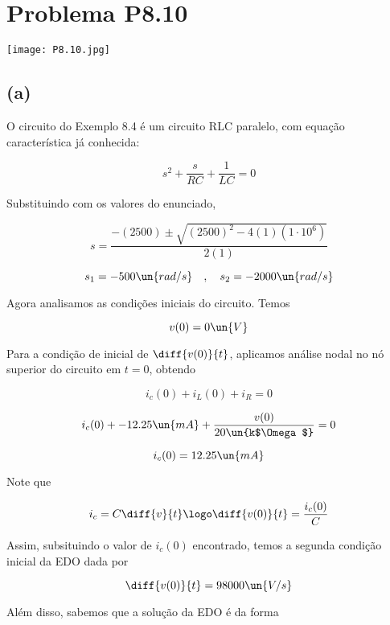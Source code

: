 
\section*{Problema P8.10}

\renewcommand*\thesection{8.10}

\begin{center}
    \texttt{[image: P8.10.jpg]}
\end{center}

\subsection*{(a)}

O circuito do Exemplo 8.4 é um circuito RLC paralelo, com equação característica já conhecida:

\begin{equation}\label{eq:8.10.1}
    s^2 + \frac{s}{RC} + \frac{1}{LC} = 0
\end{equation}

Substituindo com os valores do enunciado,

\[ s = \frac{-(2500) \pm \sqrt{(2500)^2 - 4(1)(1 \cdot 10^6)}}{2(1)} \]

\[ s_1 = -500 \un{rad/s} \quad , \quad s_2 = -2000 \un{rad/s} \]

Agora analisamos as condições iniciais do circuito. Temos

\begin{equation}\label{eq:8.10.2}
    v(0) = 0 \un{V}
\end{equation}

Para a condição de inicial de $\diff{v(0)}{t}$, aplicamos análise nodal no nó superior do circuito em $t=0$, obtendo

\[ i_c(0) + i_L(0) + i_R = 0  \]

\[ i_c(0) + -12.25 \un{mA} + \frac{v(0)}{20\un{k$\Omega$}} = 0  \]

\[ i_c(0) = 12.25 \un{mA}  \]

Note que

\[ i_c = C\diff{v}{t} \logo \diff{v(0)}{t} = \frac{i_c(0)}{C} \]

Assim, subsituindo o valor de $i_c(0)$ encontrado, temos a segunda condição inicial da EDO dada por

\begin{equation}\label{eq:8.10.3}
    \diff{v(0)}{t} = 98000 \un{V/s}
\end{equation}

Além disso, sabemos que a solução da EDO é da forma

